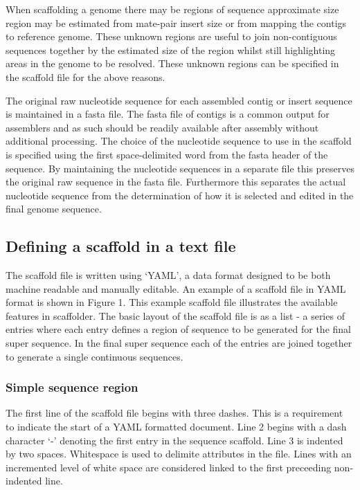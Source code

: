 \documentclass[10pt]{bmc_article}
\newenvironment{bmcformat}{\begin{raggedright}\baselineskip20pt\sloppy\setboolean{publ}{false}}{\end{raggedright}\baselineskip20pt\sloppy}
\begin{document}
\begin{bmcformat}
When scaffolding a genome there may be regions of sequence approximate size
region may be estimated from mate-pair insert size or from mapping the contigs
to reference genome. These unknown regions are useful to join non-contiguous
sequences together by the estimated size of the region whilst still
highlighting areas in the genome to be resolved. These unknown regions can be
specified in the scaffold file for the above reasons. \pb

The original raw nucleotide sequence for each assembled contig or insert
sequence is maintained in a fasta file. The fasta file of contigs is a common
output for assemblers and as such should be readily available after assembly
without additional processing. The choice of the nucleotide sequence to use in
the scaffold is specified using the first space-delimited word from the fasta
header of the sequence. By maintaining the nucleotide sequences in a separate
file this preserves the original raw sequence in the fasta file. Furthermore
this separates the actual nucleotide sequence from the determination of how it
is selected and edited in the final genome sequence. \pb

\subsection*{Defining a scaffold in a text file} %

The scaffold file is written using `YAML', a data format designed to be both
machine readable and manually editable. An example of a scaffold file in YAML
format is shown in Figure 1. This example scaffold file illustrates the
available features in scaffolder. The basic layout of the scaffold file is as
a list - a series of entries where each entry defines a region of sequence to
be generated for the final super sequence. In the final super sequence each of
the entries are joined together to generate a single continuous sequences. \pb

\subsubsection*{Simple sequence region} %

The first line of the scaffold file begins with three dashes. This is
a requirement to indicate the start of a YAML formatted document. Line 2 begins
with a dash character `-' denoting the first entry in the sequence scaffold.
Line 3 is indented by two spaces. Whitespace is used to delimite attributes in
the file. Lines with an incremented level of white space are considered linked
to the first preceeding non-indented line. \pb


\end{bmcformat}
\end{document}
